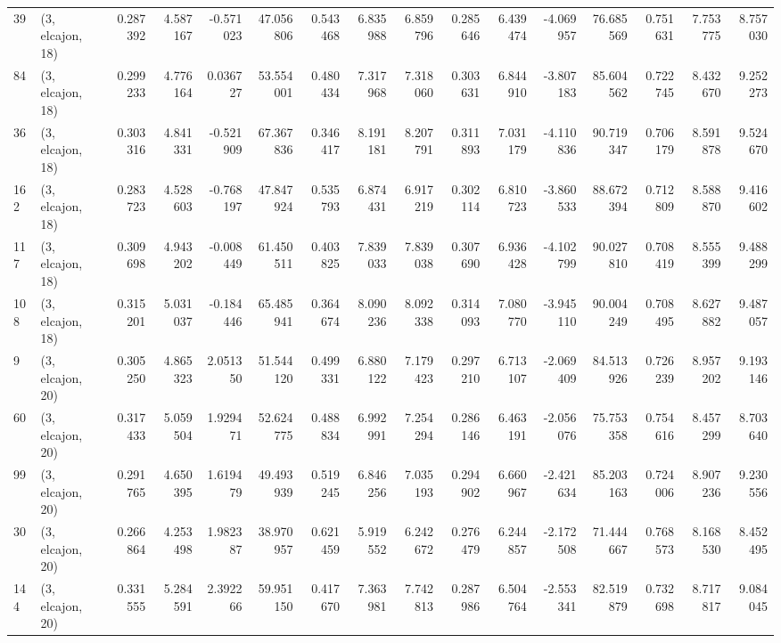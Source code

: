 \begin{tabular}{llrrrrrrrrrrrrrr}
39  &  (3, elcajon, 18) &   0.287392 &   4.587167 & -0.571023 &   47.056806 &  0.543468 &   6.835988 &   6.859796 &  0.285646 &   6.439474 &  -4.069957 &   76.685569 &  0.751631 &   7.753775 &   8.757030 \\
84  &  (3, elcajon, 18) &   0.299233 &   4.776164 &  0.036727 &   53.554001 &  0.480434 &   7.317968 &   7.318060 &  0.303631 &   6.844910 &  -3.807183 &   85.604562 &  0.722745 &   8.432670 &   9.252273 \\
36  &  (3, elcajon, 18) &   0.303316 &   4.841331 & -0.521909 &   67.367836 &  0.346417 &   8.191181 &   8.207791 &  0.311893 &   7.031179 &  -4.110836 &   90.719347 &  0.706179 &   8.591878 &   9.524670 \\
162 &  (3, elcajon, 18) &   0.283723 &   4.528603 & -0.768197 &   47.847924 &  0.535793 &   6.874431 &   6.917219 &  0.302114 &   6.810723 &  -3.860533 &   88.672394 &  0.712809 &   8.588870 &   9.416602 \\
117 &  (3, elcajon, 18) &   0.309698 &   4.943202 & -0.008449 &   61.450511 &  0.403825 &   7.839033 &   7.839038 &  0.307690 &   6.936428 &  -4.102799 &   90.027810 &  0.708419 &   8.555399 &   9.488299 \\
108 &  (3, elcajon, 18) &   0.315201 &   5.031037 & -0.184446 &   65.485941 &  0.364674 &   8.090236 &   8.092338 &  0.314093 &   7.080770 &  -3.945110 &   90.004249 &  0.708495 &   8.627882 &   9.487057 \\
9   &  (3, elcajon, 20) &   0.305250 &   4.865323 &  2.051350 &   51.544120 &  0.499331 &   6.880122 &   7.179423 &  0.297210 &   6.713107 &  -2.069409 &   84.513926 &  0.726239 &   8.957202 &   9.193146 \\
60  &  (3, elcajon, 20) &   0.317433 &   5.059504 &  1.929471 &   52.624775 &  0.488834 &   6.992991 &   7.254294 &  0.286146 &   6.463191 &  -2.056076 &   75.753358 &  0.754616 &   8.457299 &   8.703640 \\
99  &  (3, elcajon, 20) &   0.291765 &   4.650395 &  1.619479 &   49.493939 &  0.519245 &   6.846256 &   7.035193 &  0.294902 &   6.660967 &  -2.421634 &   85.203163 &  0.724006 &   8.907236 &   9.230556 \\
30  &  (3, elcajon, 20) &   0.266864 &   4.253498 &  1.982387 &   38.970957 &  0.621459 &   5.919552 &   6.242672 &  0.276479 &   6.244857 &  -2.172508 &   71.444667 &  0.768573 &   8.168530 &   8.452495 \\
144 &  (3, elcajon, 20) &   0.331555 &   5.284591 &  2.392266 &   59.951150 &  0.417670 &   7.363981 &   7.742813 &  0.287986 &   6.504764 &  -2.553341 &   82.519879 &  0.732698 &   8.717817 &   9.084045 \\

\end{tabular}
